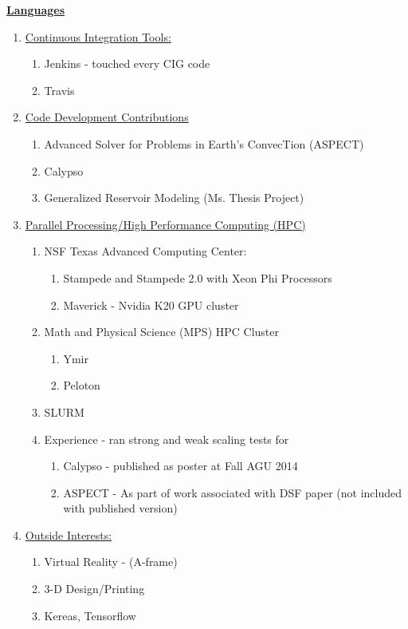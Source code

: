 \documentclass[11pt]{ltxdoc}
\begin{document}
\textbf{\underline{Languages}}
\begin{enumerate}
  \item \underline{Continuous Integration Tools:}
    \begin{enumerate}
      \item Jenkins - touched every CIG code
      \item Travis
    \end{enumerate}
  \item \underline{Code Development Contributions}
    \begin{enumerate}
      \item Advanced Solver for Problems in Earth's ConvecTion (ASPECT)
      \item Calypso
      \item Generalized Reservoir Modeling (Ms. Thesis Project)
    \end{enumerate}
  \item \underline{Parallel Processing/High Performance Computing (HPC)}
    \begin{enumerate}
      \item NSF Texas Advanced Computing Center:
      \begin{enumerate}
        \item Stampede and Stampede 2.0 with Xeon Phi Processors
        \item Maverick - Nvidia K20 GPU cluster
      \end{enumerate}
      \item Math and Physical Science (MPS) HPC Cluster
      \begin{enumerate}
        \item Ymir
        \item Peloton
      \end{enumerate}
      \item SLURM
      \item Experience - ran strong and weak scaling tests for
      \begin{enumerate}
        \item Calypso - published as poster at Fall AGU 2014
        \item ASPECT - As part of work associated with DSF paper (not included with published version)
      \end{enumerate}
    \end{enumerate}
  \item \underline{Outside Interests:}
    \begin{enumerate}
      \item Virtual Reality - (A-frame)
      \item 3-D Design/Printing
      \item Kereas, Tensorflow 
    \end{enumerate}
\end{enumerate}
\end{document}
